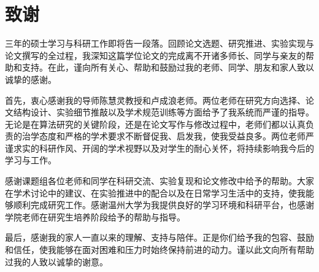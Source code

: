 \documentclass{wzuthesis} %
\begin{document}
\frontmatter
\makefirstpage

\mainmatter













\newpage

\backmatter
\renewcommand{\chaptermark}[1]{\markboth{\songti #1}{}}
\makereferences
\newpage


\newpage

\ifdefined\blind  %
\else
    \chapter{致谢}

    三年的硕士学习与科研工作即将告一段落。回顾论文选题、研究推进、实验实现与论文撰写的全过程，我深知这篇学位论文的完成离不开诸多师长、同学与亲友的帮助和支持。在此，谨向所有关心、帮助和鼓励过我的老师、同学、朋友和家人致以诚挚的感谢。

    首先，衷心感谢我的导师陈慧灵教授和卢成浪老师。两位老师在研究方向选择、论文结构设计、实验细节推敲以及学术规范训练等方面给予了我系统而严谨的指导。无论是在算法研究的关键阶段，还是在论文写作与修改过程中，老师们都以认真负责的治学态度和严格的学术要求不断督促我、启发我，使我受益良多。两位老师严谨求实的科研作风、开阔的学术视野以及对学生的耐心关怀，将持续影响我今后的学习与工作。

    感谢课题组各位老师和同学在科研交流、实验复现和论文修改中给予的帮助。大家在学术讨论中的建议、在实验推进中的配合以及在日常学习生活中的支持，使我能够顺利完成研究工作。感谢温州大学为我提供良好的学习环境和科研平台，也感谢学院老师在研究生培养阶段给予的帮助与指导。

    最后，感谢我的家人一直以来的理解、支持与陪伴。正是你们给予我的包容、鼓励和信任，使我能够在面对困难和压力时始终保持前进的动力。谨以此文向所有帮助过我的人致以诚挚的谢意。
\end{document}
